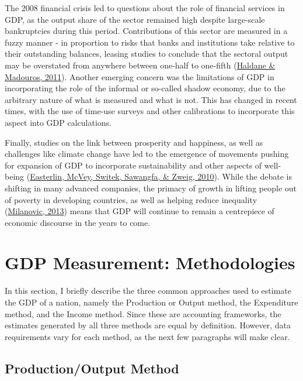 \documentclass[12pt,nobind, a4paper]{reedthesis}
\begin{document}
 The 2008 financial crisis led to questions about the role of financial services in GDP, as the output share of the sector remained high despite large-scale bankruptcies during this period. Contributions of this sector are measured in a fuzzy manner - in proportion to risks that banks and institutions take relative to their outstanding balances, leasing studies to conclude that the sectoral output may be overstated from anywhere between one-half to one-fifth (\protect\hyperlink{ref-haldane_what_2011}{Haldane \& Madouros, 2011}). Another emerging concern was the limitations of GDP in incorporating the role of the informal or so-called shadow economy, due to the arbitrary nature of what is measured and what is not. This has changed in recent times, with the use of time-use surveys and other calibrations to incorporate this aspect into GDP calculations.
 \linebreak

 Finally, studies on the link between prosperity and happiness, as well as challenges like climate change have led to the emergence of movements pushing for expansion of GDP to incorporate sustainability and other aspects of well-being (\protect\hyperlink{ref-easterlin_happinessincome_2010}{Easterlin, McVey, Switek, Sawangfa, \& Zweig, 2010}). While the debate is shifting in many advanced companies, the primacy of growth in lifting people out of poverty in developing countries, as well as helping reduce inequality (\protect\hyperlink{ref-milanovic_global_2013}{Milanovic, 2013}) means that GDP will continue to remain a centrepiece of economic discourse in the years to come.

 \hypertarget{meth}{%
 \section{GDP Measurement: Methodologies}\label{meth}}

 In this section, I briefly describe the three common approaches used to estimate the GDP of a nation, namely the Production or Output method, the Expenditure method, and the Income method. Since these are accounting frameworks, the estimates generated by all three methods are equal by definition. However, data requirements vary for each method, as the next few paragraphs will make clear.

 \hypertarget{productionoutput-method}{%
 \subsection{Production/Output Method}\label{productionoutput-method}}
\end{document}
